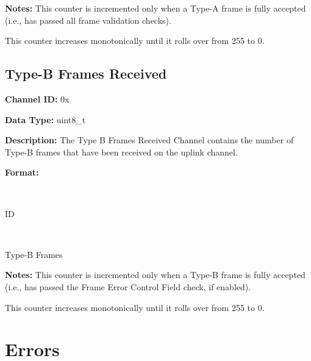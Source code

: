 \documentclass{hitec}
\newcounter{idval}
\newcommand*{\elyid}[0]{0x\padzeroes[2]\Hexadecimal{idval}\addtocounter{idval}{1}}
\newcommand*{\currid}[0]{%
		\addtocounter{idval}{-1}%
		0x\padzeroes[2]\Hexadecimal{idval}%
		\addtocounter{idval}{1}%
}
\let\oldaddcontentsline\addcontentsline
\newcommand{\starttocentries}{\let\addcontentsline\oldaddcontentsline}
\begin{document}
\noindent \textbf{Notes:} This counter is incremented only when a Type-A frame
is fully accepted (i.e., has passed all frame validation checks).

This counter increases monotonically until it rolls over from 255 to 0.

\subsection{Type-B Frames Received}
\label{chan:sdlpbs}

\noindent \textbf{Channel ID:} \elyid 

\noindent \textbf{Data Type:} uint8\_t

\noindent \textbf{Description:} The Type B Frames Received Channel contains the
number of Type-B frames that have been received on the uplink channel.

\noindent \textbf{Format:}
\newline
\newline
\begin{center}
\begin{bytefield}[endianness=big,bitwidth=2.25em]{8}
		\\
		\begin{rightwordgroup}{ID}
				\bitbox{8}{\currid}
		\end{rightwordgroup}\\
		\begin{rightwordgroup}{Type-B Frames}
		\end{rightwordgroup}
\end{bytefield}
												\end{center}

\noindent \textbf{Notes:} This counter is incremented only when a Type-B frame
is fully accepted (i.e., has passed the Frame Error Control Field check, if
enabled).

This counter increases monotonically until it rolls over from 255 to 0.

\starttocentries

\section{Errors}
\label{sec:sdlperrs}
\end{document}
